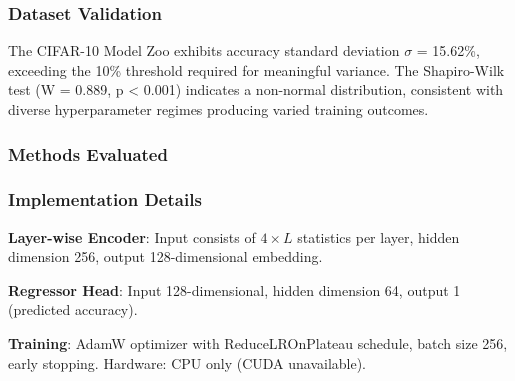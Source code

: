 
\subsubsection{Dataset Validation}

The CIFAR-10 Model Zoo exhibits accuracy standard deviation $\sigma$ = 15.62\%, exceeding the 10\% threshold required for meaningful variance. The Shapiro-Wilk test (W = 0.889, p < 0.001) indicates a non-normal distribution, consistent with diverse hyperparameter regimes producing varied training outcomes.

\subsubsection{Methods Evaluated}

\begin{table}[htbp]
\centering
{}
\end{table}

\subsubsection{Implementation Details}

\textbf{Layer-wise Encoder}: Input consists of $4\times L$ statistics per layer, hidden dimension 256, output 128-dimensional embedding.

\textbf{Regressor Head}: Input 128-dimensional, hidden dimension 64, output 1 (predicted accuracy).

\textbf{Training}: AdamW optimizer with ReduceLROnPlateau schedule, batch size 256, early stopping. Hardware: CPU only (CUDA unavailable).

